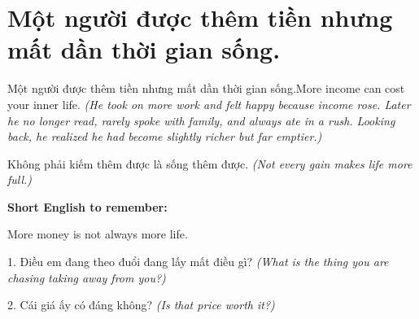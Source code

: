 \section{Một người được thêm tiền nhưng mất dần thời gian sống.}
\begin{truyen}{Một người được thêm tiền nhưng mất dần thời gian sống.}{More income can cost your inner life.}
\textit{(He took on more work and felt happy because income rose. Later he no longer read, rarely spoke with family, and always ate in a rush. Looking back, he realized he had become slightly richer but far emptier.)}
\end{truyen}
\begin{baihoc}
Không phải kiếm thêm được là sống thêm được.
\textit{(Not every gain makes life more full.)}
\end{baihoc}
\begin{ghinhoanh}
\textbf{Short English to remember:}

More money is not always more life.
\end{ghinhoanh}
\begin{tuhocnhanh}
1. Điều em đang theo đuổi đang lấy mất điều gì? \textit{(What is the thing you are chasing taking away from you?)}

2. Cái giá ấy có đáng không? \textit{(Is that price worth it?)}
\end{tuhocnhanh}
\ngancach

